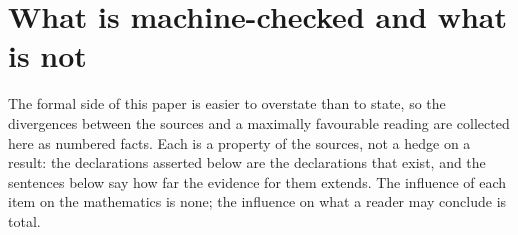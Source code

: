 %
%
\section{What is machine-checked and what is not}\label{sec:lean-boundary}

The formal side of this paper is easier to overstate than to state, so the
divergences between the sources and a maximally favourable reading are collected
here as numbered facts. Each is a property of the sources, not a hedge on a
result: the declarations asserted below are the declarations that exist, and the
sentences below say how far the evidence for them extends. The influence of each
item on the mathematics is none; the influence on what a reader may conclude is
total.

